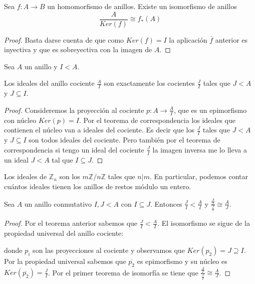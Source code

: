 \begin{corollary}
	Sea $f:A \to B$ un homomorfismo de anillos. Existe un isomorfismo de anillos $$\frac{A}{Ker(f)} \cong f_*(A)$$
\end{corollary}
\begin{proof}
	Basta darse cuenta de que como $Ker(f) = I$ la aplicación $\overline{f}$ anterior es inyectiva y que es sobreyectiva con la imagen de $A$. 
\end{proof}

\begin{proposition}
Sea $A$ un anillo y $I < A$. 

Los ideales del anillo cociente $\frac{A}{I}$ son exactamente los cocientes $\frac{J}{I}$ tales que $J < A$ y $J \subseteq I$. 
\end{proposition}
\begin{proof}
Consideremos la proyección al cociente $p:A \to \frac{A}{I}$, que es un epimorfismo con núcleo $Ker(p) = I$. Por el teorema de correspondencia los ideales que contienen el núcleo van a ideales del cociente. Es decir que los $\frac{J}{I}$ tales que $J < A$ y $J \subseteq I$ son todos ideales del cociente. Pero también por el teorema de correspondencia si tengo un ideal del cociente $\frac{J}{I}$ la imagen inversa me lo lleva a un ideal $J < A$ tal que $I \subseteq J$. 
\end{proof}

\begin{example}
Los ideales de $\mathbb{Z}_n$ son los $m\mathbb{Z}/n\mathbb{Z}$ tales que $n|m$. En particular, podemos contar cuántos ideales tienen los anillos de restos módulo un entero. 
\end{example}

\begin{theorem}
	Sea $A$ un anillo conmutativo $I,J < A$ con $I \subseteq J$. Entonces $\frac{J}{I} < \frac{A}{I}$ y $\frac{\frac{A}{I}}{\frac{J}{I}} \cong \frac{A}{J}$.
\end{theorem}
\begin{proof}
Por el teorema anterior sabemos que $\frac{J}{I} < \frac{A}{I}$. El isomorfismo se sigue de la propiedad universal del anillo cociente:


donde $p_i$ son las proyecciones al cociente y observamos que $Ker(p_2) = J \supseteq I$. Por la propiedad universal sabemos que $\overline{p_2}$ es epimorfismo y su núcleo es $Ker(\overline{p_2}) = \frac{J}{I}$. Por el primer teorema de isomorfía se tiene que $\frac{\frac{A}{I}}{\frac{J}{I}} \cong \frac{A}{J}$.
\end{proof}

